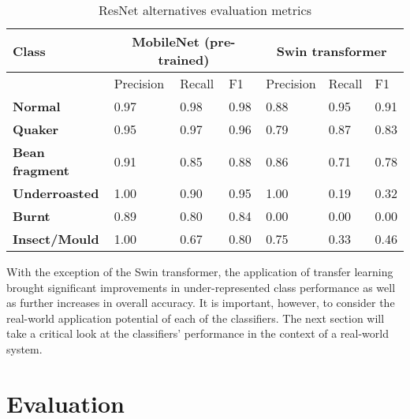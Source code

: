 \begin{table}[h]
    \centering
    \begin{tabular}{*7l}
        \toprule
        \textbf{Class} & \multicolumn{3}{c}{MobileNet (pre-trained)} & \multicolumn{3}{c}{Swin transformer} \\
        \midrule
        {} & Precision & Recall & F1 & Precision & Recall & F1 \\
        \textbf{Normal} & 0.97 & 0.98 & 0.98 & 0.88 & 0.95 & 0.91  \\
        \textbf{Quaker} & 0.95 & 0.97 & 0.96 & 0.79 & 0.87 & 0.83 \\
        \textbf{Bean fragment} & 0.91 & 0.85 & 0.88 & 0.86 & 0.71 & 0.78 \\
        \textbf{Underroasted} & 1.00 & 0.90 & 0.95 & 1.00 & 0.19 & 0.32 \\
        \textbf{Burnt} & 0.89 & 0.80 & 0.84 & 0.00 & 0.00 & 0.00 \\
        \textbf{Insect/Mould} & 1.00 & 0.67 & 0.80 & 0.75 & 0.33 & 0.46  \\
        \bottomrule
    \end{tabular}
    \caption{ResNet alternatives evaluation metrics}
    \label{tab:transfer-results-2}
\end{table}
With the exception of the Swin transformer, the application of transfer learning brought significant improvements in
under-represented class performance as well as further increases in overall accuracy.
It is important, however, to consider the real-world application potential of each of the classifiers.
The next section will take a critical look at the classifiers' performance in the context of a real-world system.
\section{Evaluation}
\label{sec:evaluation}
